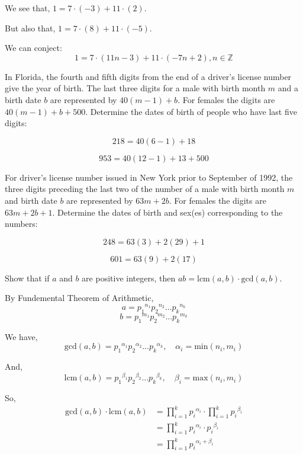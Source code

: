 \documentclass[11pt,largemargins]{homework}
\begin{document}
\quad We see that, $1=7\cdot(-3)+11\cdot(2)$.

\quad But also that, $1=7\cdot(8)+11\cdot(-5)$.

\quad We can conject:
$$1=7\cdot(11n-3)+11\cdot(-7n+2), n\in\mathbb{Z}$$


\question 
In Florida, the fourth and fifth digits from the end of a driver's license number give the year of birth. The last three 
digits for a male with birth month $m$ and a birth date $b$ are represented by $40(m-1)+b$. For females the digits are 
$40(m-1)+b+500$. Determine the dates of birth of people who have last five digits:

\begin{alphaparts}
    $$218 = 40(6-1)+18$$

    $$953 = 40(12-1)+13+500$$

\end{alphaparts}

\question 
For driver's license number issued in New York prior to September of 1992, the three digits preceding the last two of the 
number of a male with birth month $m$ and birth date $b$ are represented by $63m+2b$. For females the digits are 
$63m+2b+1$. Determine the dates of birth and sex(es) corresponding to the numbers:

\begin{alphaparts}
    $$248 = 63(3)+2(29)+1$$

    $$601 = 63(9)+2(17)$$

\end{alphaparts}

\question
Show that if $a$ and $b$ are positive integers, then $ab = \text{lcm} (a,b) \cdot \text{gcd} (a,b)$.

\quad By Fundemental Theorem of Arithmetic, 
$$a = {p_1}^{n_1}{p_2}^{n_2}...{p_k}^{n_k}$$
$$b = {p_1}^{m_1}{p_2}^{m_2}...{p_k}^{m_k}$$

\quad We have,
$$\text{gcd}(a,b) = {p_1}^{\alpha_1}{p_2}^{\alpha_2}...{p_k}^{\alpha_k}, \quad \alpha_i = \text{min}(n_i, m_i)$$

\quad And, 
$$\text{lcm}(a,b) = {p_1}^{\beta_1}{p_2}^{\beta_2}...{p_k}^{\beta_k}, \quad \beta_i = \text{max}(n_i, m_i)$$

\quad So,
\begin{align*}
    \text{gcd}(a,b)\cdot\text{lcm}(a,b) &= \prod_{i=1}^k {p_i}^{\alpha_i} \cdot \prod_{i=1}^k {p_i}^{\beta_i}\\
                                        &= \prod_{i=1}^k {p_i}^{\alpha_i}\cdot{p_i}^{\beta_i}\\
                                        &= \prod_{i=1}^k {p_i}^{\alpha_i + \beta_i}
\end{align*}
\end{document}
